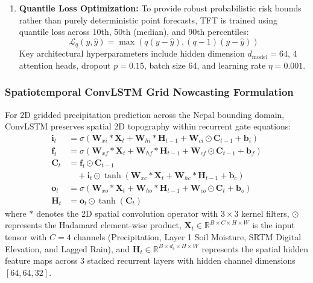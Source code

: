\documentclass[journal]{IEEEtran}
\begin{document}
\begin{enumerate}
    The resulting attention matrices $\mathbf{A}_{t, \tau}$ provide direct interpretability regarding which historical lookback days most heavily govern forecasted peak discharge at lead time $\tau$.
    \item \textbf{Quantile Loss Optimization:} To provide robust probabilistic risk bounds rather than purely deterministic point forecasts, TFT is trained using quantile loss across 10th, 50th (median), and 90th percentiles:
    \begin{equation}
    \mathcal{L}_q(y, \hat{y}) = \max\left(q(y - \hat{y}), (q - 1)(y - \hat{y})\right)
    \end{equation}
    Key architectural hyperparameters include hidden dimension $d_{\text{model}} = 64$, 4 attention heads, dropout $p = 0.15$, batch size 64, and learning rate $\eta = 0.001$.
\end{enumerate}

\subsubsection{Spatiotemporal ConvLSTM Grid Nowcasting Formulation}
For 2D gridded precipitation prediction across the Nepal bounding domain, ConvLSTM \cite{shi2015convolutional} preserves spatial 2D topography within recurrent gate equations:
\begin{align}
\mathbf{i}_t &= \sigma(\mathbf{W}_{xi} \ast \mathbf{X}_t + \mathbf{W}_{hi} \ast \mathbf{H}_{t-1} + \mathbf{W}_{ci} \odot \mathbf{C}_{t-1} + \mathbf{b}_i) \\
\mathbf{f}_t &= \sigma(\mathbf{W}_{xf} \ast \mathbf{X}_t + \mathbf{W}_{hf} \ast \mathbf{H}_{t-1} + \mathbf{W}_{cf} \odot \mathbf{C}_{t-1} + \mathbf{b}_f) \\
\mathbf{C}_t &= \mathbf{f}_t \odot \mathbf{C}_{t-1} \nonumber \\
             &\quad + \mathbf{i}_t \odot \tanh(\mathbf{W}_{xc} \ast \mathbf{X}_t + \mathbf{W}_{hc} \ast \mathbf{H}_{t-1} + \mathbf{b}_c) \\
\mathbf{o}_t &= \sigma(\mathbf{W}_{xo} \ast \mathbf{X}_t + \mathbf{W}_{ho} \ast \mathbf{H}_{t-1} + \mathbf{W}_{co} \odot \mathbf{C}_t + \mathbf{b}_o) \\
\mathbf{H}_t &= \mathbf{o}_t \odot \tanh(\mathbf{C}_t)
\end{align}
where $\ast$ denotes the 2D spatial convolution operator with $3 \times 3$ kernel filters, $\odot$ represents the Hadamard element-wise product, $\mathbf{X}_t \in \mathbb{R}^{B \times C \times H \times W}$ is the input tensor with $C = 4$ channels (Precipitation, Layer 1 Soil Moisture, SRTM Digital Elevation, and Lagged Rain), and $\mathbf{H}_t \in \mathbb{R}^{B \times d_c \times H \times W}$ represents the spatial hidden feature maps across 3 stacked recurrent layers with hidden channel dimensions $[64, 64, 32]$.
\end{document}
